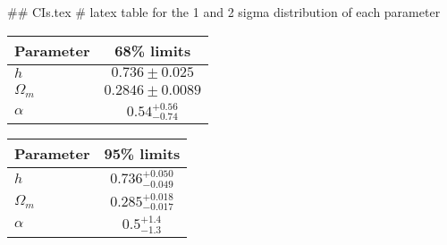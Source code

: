## CIs.tex
# latex table for the 1 and 2 sigma distribution of each parameter

\begin{tabular} { l  c}
 Parameter &  68\% limits\\
\hline
{\boldmath$h              $} & $0.736\pm 0.025            $\\
{\boldmath$\Omega_m       $} & $0.2846\pm 0.0089          $\\
{\boldmath$\alpha         $} & $0.54^{+0.56}_{-0.74}      $\\
\hline
\end{tabular}

\begin{tabular} { l  c}
 Parameter &  95\% limits\\
\hline
{\boldmath$h              $} & $0.736^{+0.050}_{-0.049}   $\\
{\boldmath$\Omega_m       $} & $0.285^{+0.018}_{-0.017}   $\\
{\boldmath$\alpha         $} & $0.5^{+1.4}_{-1.3}         $\\
\hline
\end{tabular}

